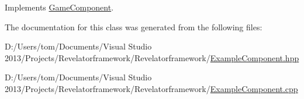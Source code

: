 Implements \hyperlink{class_game_component_a01b3434d7bf6a63552e7ea4fd68744fe}{Game\-Component}.



The documentation for this class was generated from the following files\-:\begin{DoxyCompactItemize}
\item 
D\-:/\-Users/tom/\-Documents/\-Visual Studio 2013/\-Projects/\-Revelatorframework/\-Revelatorframework/\hyperlink{_example_component_8hpp}{Example\-Component.\-hpp}\item 
D\-:/\-Users/tom/\-Documents/\-Visual Studio 2013/\-Projects/\-Revelatorframework/\-Revelatorframework/\hyperlink{_example_component_8cpp}{Example\-Component.\-cpp}\end{DoxyCompactItemize}

